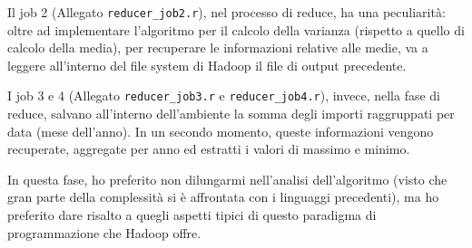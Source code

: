 Il job 2 (Allegato \texttt{reducer\_job2.r}), nel processo di reduce, ha una peculiarità: oltre ad implementare l'algoritmo per il calcolo della varianza (rispetto a quello di calcolo della media), per recuperare le informazioni relative alle medie, va a leggere all'interno del file system di Hadoop il file di output precedente.

I job 3 e 4 (Allegato \texttt{reducer\_job3.r} e  \texttt{reducer\_job4.r}), invece, nella fase di reduce, salvano all'interno dell'ambiente la somma degli importi raggruppati per data (mese dell'anno). In un secondo momento, queste informazioni vengono recuperate, aggregate per anno ed estratti i valori di massimo e minimo.

In questa fase, ho preferito non dilungarmi nell'analisi dell'algoritmo (visto che gran parte della complessità si è affrontata con i linguaggi precedenti), ma ho preferito dare risalto a quegli aspetti tipici di questo paradigma di programmazione che Hadoop offre.
